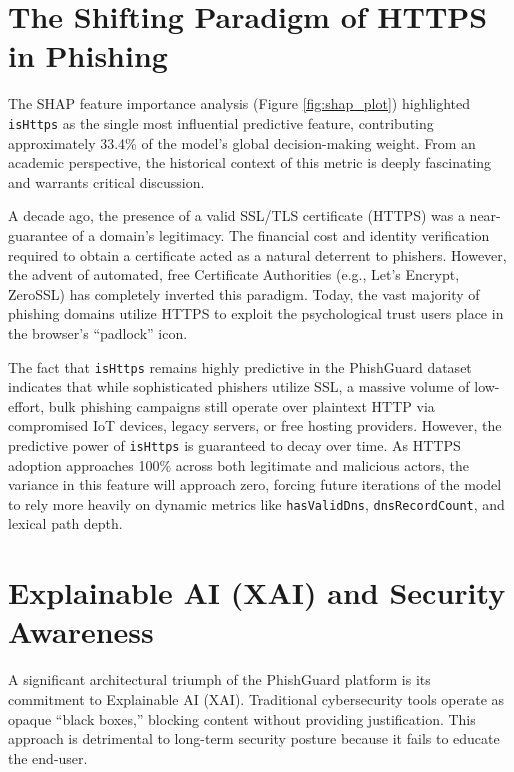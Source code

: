 \section{The Shifting Paradigm of HTTPS in
Phishing}\label{the-shifting-paradigm-of-https-in-phishing}

The SHAP feature importance analysis (Figure \ref{fig:shap_plot}) highlighted
\texttt{isHttps} as the single most influential predictive feature,
contributing approximately 33.4\% of the model's global decision-making
weight. From an academic perspective, the historical context of this
metric is deeply fascinating and warrants critical discussion.

A decade ago, the presence of a valid SSL/TLS certificate (HTTPS) was a
near-guarantee of a domain's legitimacy. The financial cost and identity
verification required to obtain a certificate acted as a natural
deterrent to phishers. However, the advent of automated, free
Certificate Authorities (e.g., Let's Encrypt, ZeroSSL) has completely
inverted this paradigm. Today, the vast majority of phishing domains
utilize HTTPS to exploit the psychological trust users place in the
browser's ``padlock'' icon.

The fact that \texttt{isHttps} remains highly predictive in the
PhishGuard dataset indicates that while sophisticated phishers utilize
SSL, a massive volume of low-effort, bulk phishing campaigns still
operate over plaintext HTTP via compromised IoT devices, legacy servers,
or free hosting providers. However, the predictive power of
\texttt{isHttps} is guaranteed to decay over time. As HTTPS adoption
approaches 100\% across both legitimate and malicious actors, the
variance in this feature will approach zero, forcing future iterations
of the model to rely more heavily on dynamic metrics like
\texttt{hasValidDns}, \texttt{dnsRecordCount}, and lexical path depth.

\section{Explainable AI (XAI) and Security
Awareness}\label{explainable-ai-xai-and-security-awareness}

A significant architectural triumph of the PhishGuard platform is its
commitment to Explainable AI (XAI). Traditional cybersecurity tools
operate as opaque ``black boxes,'' blocking content without providing
justification. This approach is detrimental to long-term security
posture because it fails to educate the end-user.

